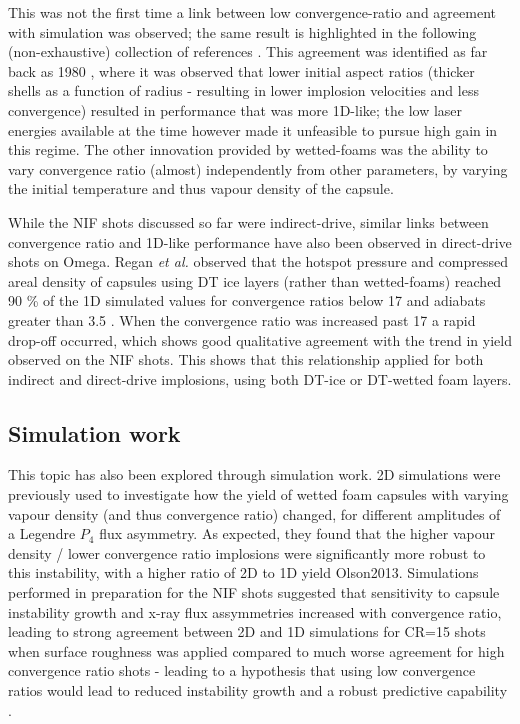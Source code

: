 This was not the first time a link between low convergence-ratio and agreement with simulation was observed; the same result is highlighted in the following (non-exhaustive) collection of references \cite{Kato1996, Nishimura2000, Meyerhofer2001, Li2002, Lindl2004, LePape2014, Khan2016, Haines2017a}. This agreement was identified as far back as 1980 \cite{Key1980}, where it was observed that lower initial aspect ratios (thicker shells as a function of radius - resulting in lower implosion velocities and less convergence) resulted in performance that was more 1D-like; the low laser energies available at the time however made it unfeasible to pursue high gain in this regime. The other innovation provided by wetted-foams was the ability to vary convergence ratio (almost) independently from other parameters, by varying the initial temperature and thus vapour density of the capsule.

While the NIF shots discussed so far were indirect-drive, similar links between convergence ratio and 1D-like performance have also been observed in direct-drive shots on Omega. Regan \textit{et al.} observed that the hotspot pressure and compressed areal density of capsules using DT ice layers (rather than wetted-foams) reached 90 \% of the 1D simulated values for convergence ratios below 17 and adiabats greater than 3.5 \cite{Regan2016}. When the convergence ratio was increased past 17 a rapid drop-off occurred, which shows good qualitative agreement with the trend in yield observed on the NIF shots. This shows that this relationship applied for both indirect and direct-drive implosions, using both DT-ice or DT-wetted foam layers.


\subsection{Simulation work} 

This topic has also been explored through simulation work. 2D simulations were previously used to investigate how the yield of wetted foam capsules with varying vapour density (and thus convergence ratio) changed, for different amplitudes of a Legendre $P_4$ flux asymmetry. As expected, they found that the higher vapour density / lower convergence ratio implosions were significantly more robust to this instability, with a higher ratio of 2D to 1D yield Olson2013. Simulations performed in preparation for the NIF shots suggested that sensitivity to capsule instability growth and x-ray flux assymmetries increased with convergence ratio, leading to strong agreement between 2D and 1D simulations for CR=15 shots when surface roughness was applied compared to much worse agreement for high convergence ratio shots - leading to a hypothesis that using low convergence ratios would lead to reduced instability growth and a robust predictive capability \cite{Olson2016a}. 

